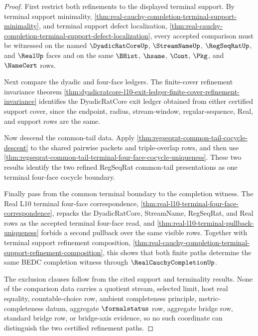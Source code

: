 \begin{proof}
First restrict both refinements to the displayed terminal support. By terminal support minimality, \autoref{thm:real-cauchy-completion-terminal-support-minimality}, and terminal support defect localization, \autoref{thm:real-cauchy-completion-terminal-support-defect-localization}, every accepted comparison must be witnessed on the named $\DyadicRatCoreUp$, $\StreamNameUp$, $\RegSeqRatUp$, and $\RealUp$ faces and on the same $\BHist$, $\hsame$, $\Cont$, $\Pkg$, and $\NameCert$ rows.

Next compare the dyadic and four-face ledgers. The finite-cover refinement invariance theorem \autoref{thm:dyadicratcore-l10-exit-ledger-finite-cover-refinement-invariance} identifies the DyadicRatCore exit ledger obtained from either certified support cover, since the endpoint, radius, stream-window, regular-sequence, Real, and support rows are the same.

Now descend the common-tail data. Apply \autoref{thm:regseqrat-common-tail-cocycle-descent} to the shared pairwise packets and triple-overlap rows, and then use \autoref{thm:regseqrat-common-tail-terminal-four-face-cocycle-uniqueness}. These two results identify the two refined RegSeqRat common-tail presentations as one terminal four-face cocycle boundary.

Finally pass from the common terminal boundary to the completion witness. The Real L10 terminal four-face correspondence, \autoref{thm:real-l10-terminal-four-face-correspondence}, repacks the DyadicRatCore, StreamName, RegSeqRat, and Real rows as the accepted terminal four-face read, and \autoref{thm:real-l10-terminal-pullback-uniqueness} forbids a second pullback over the same visible rows. Together with terminal support refinement composition, \autoref{thm:real-cauchy-completion-terminal-support-refinement-composition}, this shows that both finite paths determine the same BEDC completion witness through $\RealCauchyCompletionUp$.

The exclusion clauses follow from the cited support and terminality results. None of the comparison data carries a quotient stream, selected limit, host real equality, countable-choice row, ambient completeness principle, metric-completeness datum, aggregate $\formalstatus$ row, aggregate bridge row, standard bridge row, or bridge-axis evidence, so no such coordinate can distinguish the two certified refinement paths.
\end{proof}

